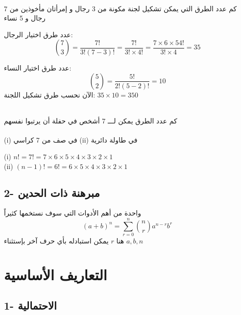 \begin{solution}
\begin{enumerate}
    \end{enumerate}
    
    \begin{example}
    	\\
    	كم عدد الطرق التي يمكن تشكيل لجنة مكونة من 3 رجال و إمرأتان مأخوذين من 7 رجال و 5 نساء
    \end{example}
    
    \begin{solution}
    	عدد طرق اختيار الرجال:
    	\[
    	\binom{7}{3} = \frac{7!}{3!(7-3)!} = \frac{7!}{3!\times 4!} = \frac{7\times 6\times 5 4!}{3!\times 4} = 35
    	\]
    	
    	عدد طرق اختيار النساء:
    	\[
    	\binom{5}{2} = \frac{5!}{2!(5-2)!} = 10
    	\]
    	الآن نحسب طرق تشكيل اللجنة: \(35\times 10 = 350\)
    \end{solution}
\end{solution}

\begin{example}
	\\
	كم عدد الطرق يمكن لـــ 7 أشخص في حفلة أن يرتبوا نفسهم\\
	\\
	(i) في صف من 7 كراسي \quad (ii) في طاولة دائرية
\end{example}

\begin{solution}
	(i) \(n! = 7! = 7\times 6\times 5\times 4\times 3\times 2\times 1\)\\
	(ii) \((n-1)! = 6! = 6\times 5\times 4\times 3\times 2\times 1\)
\end{solution}

\subsection*{2- مبرهنة ذات الحدين }
واحدة من أهم الأدوات التي سوف نستخمها كثيراً
\[
(a+b)^n = \sum_{r=0}^{n} \binom{n}{r} a^{n-r} b^r
\]
هنا \(r\) يمكن استبادله بأي حرف آخر بإستثناء \(a, b, n\)

\section{التعاريف الأساسية}

\subsection*{1- الاحتمالية}

